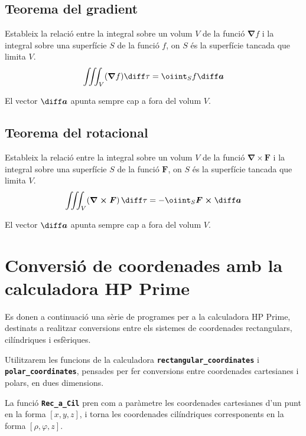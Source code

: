 \documentclass[catalan,a4paper,twoside,11pt]{article}
\begin{document}
\subsection{Teorema del gradient}
Estableix la relació entre la integral sobre un volum $V$ de la funció $\boldsymbol{\nabla}f$ i la integral sobre una superfície $S$ de la funció $f$, on $S$ és la superfície tancada que limita $V$.
\begin{equation}
    \iiint_V(\boldsymbol{\nabla}f)\diff \tau = \oiint_S f\boldsymbol{\diff a}
\end{equation}

El vector $\boldsymbol{\diff a}$ apunta sempre cap a fora del volum $V$.

\subsection{Teorema del rotacional}
Estableix la relació entre la integral sobre un volum $V$ de la funció $\boldsymbol{\nabla\times F}$ i la integral sobre una superfície $S$ de la funció $\boldsymbol{F}$, on $S$ és la superfície tancada que limita $V$.
\begin{equation}
    \iiint_V(\boldsymbol{\nabla\times F})\,\diff \tau=-\oiint_S
    \boldsymbol{F\times\diff a}
\end{equation}

El vector $\boldsymbol{\diff a}$ apunta sempre cap a fora del volum $V$.

\section{Conversió de coordenades amb la calculadora HP Prime}

\lstset{
	language=HPPRIME,
	basicstyle=\small\sf,
	numbers=left,
	frame=lines
}

Es donen a continuació una sèrie de programes per a la calculadora HP Prime, destinats a realitzar conversions entre els  sistemes de coordenades rectangulars, cilíndriques i esfèriques.

Utilitzarem les funcions de la calculadora \texttt{\textbf{rectangular\_coordinates}} i \texttt{\textbf{polar\_coordinates}}, pensades per fer conversions entre coordenades cartesianes i polars, en dues dimensions.

La funció \texttt{\textbf{Rec\_a\_Cil}} pren com a paràmetre les coordenades cartesianes d'un punt en la forma $[x,y,z]$, i torna les coordenades cilíndriques corresponents en la forma $[\rho,\varphi,z]$.

\end{document}
